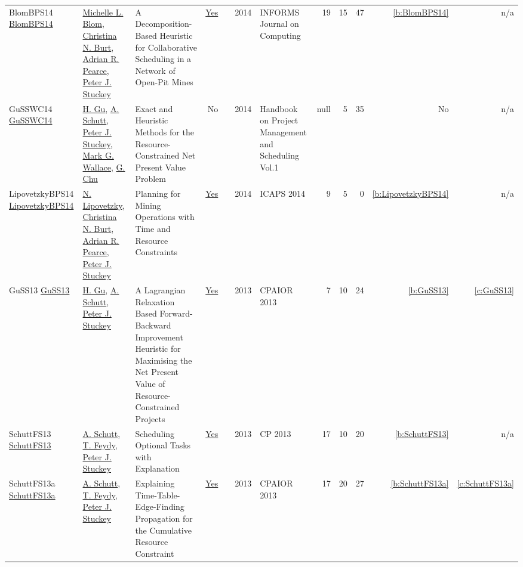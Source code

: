 {\begin{longtable}{>{\raggedright\arraybackslash}p{3cm}>{\raggedright\arraybackslash}p{6cm}>{\raggedright\arraybackslash}p{6.5cm}rrrp{2.5cm}rrrrr}
BlomBPS14 \href{https://doi.org/10.1287/ijoc.2013.0590}{BlomBPS14} & \hyperref[auth:a801]{Michelle L. Blom}, \hyperref[auth:a325]{Christina N. Burt}, \hyperref[auth:a327]{Adrian R. Pearce}, \hyperref[auth:a126]{Peter J. Stuckey} & A Decomposition-Based Heuristic for Collaborative Scheduling in a Network of Open-Pit Mines & \href{../works/BlomBPS14.pdf}{Yes} & \cite{BlomBPS14} & 2014 & INFORMS Journal on Computing & 19 & 15 & 47 & \ref{b:BlomBPS14} & n/a\\
GuSSWC14 \href{http://dx.doi.org/10.1007/978-3-319-05443-8_14}{GuSSWC14} & \hyperref[auth:a339]{H. Gu}, \hyperref[auth:a125]{A. Schutt}, \hyperref[auth:a126]{Peter J. Stuckey}, \hyperref[auth:a117]{Mark G. Wallace}, \hyperref[auth:a346]{G. Chu} & Exact and Heuristic Methods for the Resource-Constrained Net Present Value Problem & No & \cite{GuSSWC14} & 2014 & Handbook on Project Management and Scheduling Vol.1 & null & 5 & 35 & No & n/a\\
LipovetzkyBPS14 \href{http://www.aaai.org/ocs/index.php/ICAPS/ICAPS14/paper/view/7942}{LipovetzkyBPS14} & \hyperref[auth:a326]{N. Lipovetzky}, \hyperref[auth:a325]{Christina N. Burt}, \hyperref[auth:a327]{Adrian R. Pearce}, \hyperref[auth:a126]{Peter J. Stuckey} & Planning for Mining Operations with Time and Resource Constraints & \href{../works/LipovetzkyBPS14.pdf}{Yes} & \cite{LipovetzkyBPS14} & 2014 & ICAPS 2014 & 9 & 5 & 0 & \ref{b:LipovetzkyBPS14} & n/a\\
GuSS13 \href{https://doi.org/10.1007/978-3-642-38171-3_24}{GuSS13} & \hyperref[auth:a339]{H. Gu}, \hyperref[auth:a125]{A. Schutt}, \hyperref[auth:a126]{Peter J. Stuckey} & A Lagrangian Relaxation Based Forward-Backward Improvement Heuristic for Maximising the Net Present Value of Resource-Constrained Projects & \href{../works/GuSS13.pdf}{Yes} & \cite{GuSS13} & 2013 & CPAIOR 2013 & 7 & 10 & 24 & \ref{b:GuSS13} & \ref{c:GuSS13}\\
SchuttFS13 \href{https://doi.org/10.1007/978-3-642-40627-0_47}{SchuttFS13} & \hyperref[auth:a125]{A. Schutt}, \hyperref[auth:a155]{T. Feydy}, \hyperref[auth:a126]{Peter J. Stuckey} & Scheduling Optional Tasks with Explanation & \href{../works/SchuttFS13.pdf}{Yes} & \cite{SchuttFS13} & 2013 & CP 2013 & 17 & 10 & 20 & \ref{b:SchuttFS13} & n/a\\
SchuttFS13a \href{https://doi.org/10.1007/978-3-642-38171-3_16}{SchuttFS13a} & \hyperref[auth:a125]{A. Schutt}, \hyperref[auth:a155]{T. Feydy}, \hyperref[auth:a126]{Peter J. Stuckey} & Explaining Time-Table-Edge-Finding Propagation for the Cumulative Resource Constraint & \href{../works/SchuttFS13a.pdf}{Yes} & \cite{SchuttFS13a} & 2013 & CPAIOR 2013 & 17 & 20 & 27 & \ref{b:SchuttFS13a} & \ref{c:SchuttFS13a}\\

\end{longtable}}
